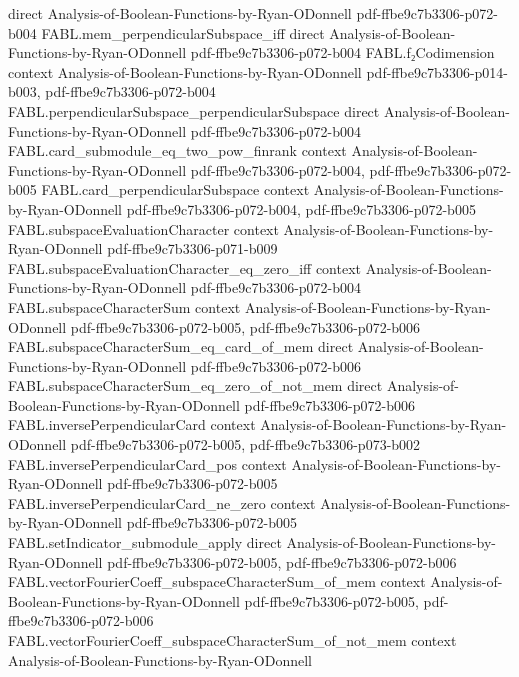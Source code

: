 \begin{theorem}
  {direct}
  {Analysis-of-Boolean-Functions-by-Ryan-ODonnell}
  {pdf-ffbe9c7b3306-p072-b004}
\proofstep
  {FABL.mem_perpendicularSubspace_iff}
  {direct}
  {Analysis-of-Boolean-Functions-by-Ryan-ODonnell}
  {pdf-ffbe9c7b3306-p072-b004}
\proofstep
  {FABL.f₂Codimension}
  {context}
  {Analysis-of-Boolean-Functions-by-Ryan-ODonnell}
  {pdf-ffbe9c7b3306-p014-b003,
    pdf-ffbe9c7b3306-p072-b004}
\proofstep
  {FABL.perpendicularSubspace_perpendicularSubspace}
  {direct}
  {Analysis-of-Boolean-Functions-by-Ryan-ODonnell}
  {pdf-ffbe9c7b3306-p072-b004}
\proofstep
  {FABL.card_submodule_eq_two_pow_finrank}
  {context}
  {Analysis-of-Boolean-Functions-by-Ryan-ODonnell}
  {pdf-ffbe9c7b3306-p072-b004,
    pdf-ffbe9c7b3306-p072-b005}
\proofstep
  {FABL.card_perpendicularSubspace}
  {context}
  {Analysis-of-Boolean-Functions-by-Ryan-ODonnell}
  {pdf-ffbe9c7b3306-p072-b004,
    pdf-ffbe9c7b3306-p072-b005}
\proofstep
  {FABL.subspaceEvaluationCharacter}
  {context}
  {Analysis-of-Boolean-Functions-by-Ryan-ODonnell}
  {pdf-ffbe9c7b3306-p071-b009}
\proofstep
  {FABL.subspaceEvaluationCharacter_eq_zero_iff}
  {context}
  {Analysis-of-Boolean-Functions-by-Ryan-ODonnell}
  {pdf-ffbe9c7b3306-p072-b004}
\proofstep
  {FABL.subspaceCharacterSum}
  {context}
  {Analysis-of-Boolean-Functions-by-Ryan-ODonnell}
  {pdf-ffbe9c7b3306-p072-b005,
    pdf-ffbe9c7b3306-p072-b006}
\proofstep
  {FABL.subspaceCharacterSum_eq_card_of_mem}
  {direct}
  {Analysis-of-Boolean-Functions-by-Ryan-ODonnell}
  {pdf-ffbe9c7b3306-p072-b006}
\proofstep
  {FABL.subspaceCharacterSum_eq_zero_of_not_mem}
  {direct}
  {Analysis-of-Boolean-Functions-by-Ryan-ODonnell}
  {pdf-ffbe9c7b3306-p072-b006}
\proofstep
  {FABL.inversePerpendicularCard}
  {context}
  {Analysis-of-Boolean-Functions-by-Ryan-ODonnell}
  {pdf-ffbe9c7b3306-p072-b005,
    pdf-ffbe9c7b3306-p073-b002}
\proofstep
  {FABL.inversePerpendicularCard_pos}
  {context}
  {Analysis-of-Boolean-Functions-by-Ryan-ODonnell}
  {pdf-ffbe9c7b3306-p072-b005}
\proofstep
  {FABL.inversePerpendicularCard_ne_zero}
  {context}
  {Analysis-of-Boolean-Functions-by-Ryan-ODonnell}
  {pdf-ffbe9c7b3306-p072-b005}
\proofstep
  {FABL.setIndicator_submodule_apply}
  {direct}
  {Analysis-of-Boolean-Functions-by-Ryan-ODonnell}
  {pdf-ffbe9c7b3306-p072-b005,
    pdf-ffbe9c7b3306-p072-b006}
\proofstep
  {FABL.vectorFourierCoeff_subspaceCharacterSum_of_mem}
  {context}
  {Analysis-of-Boolean-Functions-by-Ryan-ODonnell}
  {pdf-ffbe9c7b3306-p072-b005,
    pdf-ffbe9c7b3306-p072-b006}
\proofstep
  {FABL.vectorFourierCoeff_subspaceCharacterSum_of_not_mem}
  {context}
  {Analysis-of-Boolean-Functions-by-Ryan-ODonnell}

\end{theorem}
